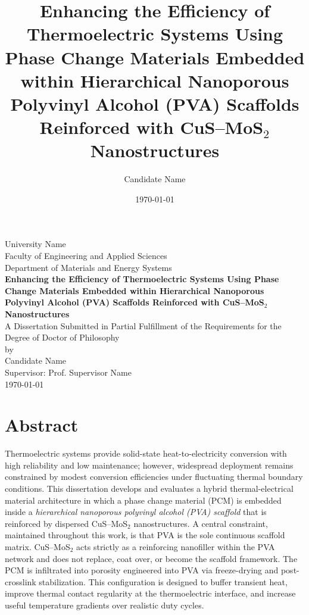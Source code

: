 \documentclass[12pt,a4paper]{report}
\title{Enhancing the Efficiency of Thermoelectric Systems Using Phase Change Materials Embedded within Hierarchical Nanoporous Polyvinyl Alcohol (PVA) Scaffolds Reinforced with CuS--MoS$_2$ Nanostructures}
\author{Candidate Name}
\date{\today}
\begin{document}
\begin{titlepage}
    \centering
    {\Large University Name\\[1.0cm]}
    {\large Faculty of Engineering and Applied Sciences\\[0.5cm]}
    {\large Department of Materials and Energy Systems\\[1.5cm]}
    {\Huge\bfseries Enhancing the Efficiency of Thermoelectric Systems Using Phase Change Materials Embedded within Hierarchical Nanoporous Polyvinyl Alcohol (PVA) Scaffolds Reinforced with CuS--MoS$_2$ Nanostructures\\[1.5cm]}
    {\Large A Dissertation Submitted in Partial Fulfillment of the Requirements for the Degree of Doctor of Philosophy\\[1.5cm]}
    {\large by\\[0.2cm] Candidate Name\\[1.0cm]}
    {\large Supervisor: Prof. Supervisor Name\\[2.0cm]}
    {\large \today}
\end{titlepage}


\chapter*{Abstract}
Thermoelectric systems provide solid-state heat-to-electricity conversion with high reliability and low maintenance; however, widespread deployment remains constrained by modest conversion efficiencies under fluctuating thermal boundary conditions. This dissertation develops and evaluates a hybrid thermal-electrical material architecture in which a phase change material (PCM) is embedded inside a \emph{hierarchical nanoporous polyvinyl alcohol (PVA) scaffold} that is reinforced by dispersed CuS--MoS$_2$ nanostructures. A central constraint, maintained throughout this work, is that PVA is the sole continuous scaffold matrix. CuS--MoS$_2$ acts strictly as a reinforcing nanofiller within the PVA network and does not replace, coat over, or become the scaffold framework. The PCM is infiltrated into porosity engineered into PVA via freeze-drying and post-crosslink stabilization. This configuration is designed to buffer transient heat, improve thermal contact regularity at the thermoelectric interface, and increase useful temperature gradients over realistic duty cycles.
\end{document}

